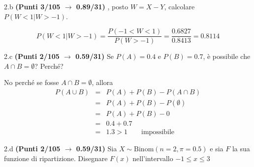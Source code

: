 \documentclass[
  11pt,
]{book}
\theoremstyle{mytheoremstyle}
\theoremstyle{mydefstyle}
\newenvironment{sol}
  {
  \begin{tcolorbox}[enhanced,breakable,arc=0.1mm,boxrule=1pt,colback=white,colframe=iblue,
  title=\bf \fontfamily{lmss}\selectfont \hspace{.5 cm} Soluzione,drop fuzzy shadow]

}{
\end{tcolorbox}
  }
\begin{document}
2.b \textbf{(Punti 3/105 \(\rightarrow\) 0.89/31)} , posto \(W=X-Y\), calcolare \(P(W<1|W>-1)\).

\begin{sol}
\[ 
P(W<1|W>-1)=\frac{P(-1<W<1)}{P(W>-1)}=\frac{0.6827}{0.8413}=0.8114
\]

\end{sol}

2.c \textbf{(Punti 2/105 \(\rightarrow\) 0.59/31)} Se \(P(A)=0.4\) e \(P(B)=0.7\), è possibile che \(A\cap B=\emptyset\)? Perché?

\begin{sol}
No perché se fosse \(A\cap B=\emptyset\), allora
\begin{eqnarray*}
P(A \cup B)    &=&  P(A) + P(B) - P(A\cap B)\\
               &=&  P(A) + P(B) - P(\emptyset)\\
               &=&  P(A) + P(B) - 0 \\
               &=&  0.4 + 0.7\\
               &=& 1.3 > 1 \qquad\text{impossibile}
\end{eqnarray*}

\end{sol}

2.d \textbf{(Punti 2/105 \(\rightarrow\) 0.59/31)} Sia \(X\sim\text{Binom}(n=2,\pi=0.5)\) e sia \(F\) la sua funzione di ripartizione. Disegnare \(F(x)\) nell'intervallo \(-1\leq x\leq 3\)
\end{document}
